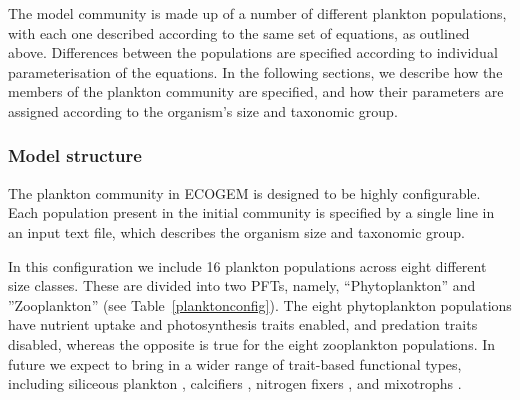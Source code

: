 \documentclass[gmd, manuscript]{copernicus}
\begin{document}
The model community is made up of a number of different plankton populations, with each one described according to the same set of equations, as outlined above. Differences between the populations are specified according to individual parameterisation of the equations. In the following sections, we describe how the members of the plankton community are specified, and how their parameters are assigned according to the organism's size and taxonomic group.

\subsubsection{Model structure}\label{community_structure}

The plankton community in ECOGEM is designed to be highly configurable. Each population present in the initial community is specified by a single line in an input text file, which describes the organism size and taxonomic group.


In this configuration we include 16 plankton populations across eight different size classes. These are divided into two PFTs, namely, ``Phytoplankton'' and ''Zooplankton'' (see Table~\ref{planktonconfig}). The eight phytoplankton populations have nutrient uptake and photosynthesis traits enabled, and predation traits disabled, whereas the opposite is true for the eight zooplankton populations. In future we expect to bring in a wider range of trait-based functional types, including siliceous plankton \citep[e.g.][]{Follows:2007}, calcifiers \citep{Monteiro:2016}, nitrogen fixers \citep{Monteiro:2010}, and mixotrophs \citep{Ward:2016}.
\end{document}
